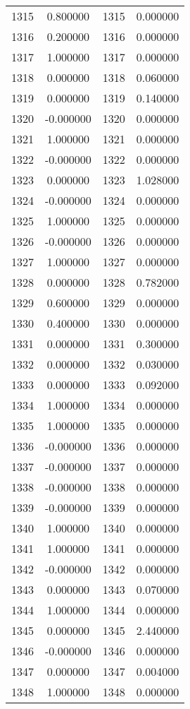 \documentclass[12pt]{article}
\begin{document}
\begin{longtable}{@{}cccc@{}}
1315 & 0.800000 & 1315 & 0.000000 \\
1316 & 0.200000 & 1316 & 0.000000 \\
1317 & 1.000000 & 1317 & 0.000000 \\
1318 & 0.000000 & 1318 & 0.060000 \\
1319 & 0.000000 & 1319 & 0.140000 \\
1320 & -0.000000 & 1320 & 0.000000 \\
1321 & 1.000000 & 1321 & 0.000000 \\
1322 & -0.000000 & 1322 & 0.000000 \\
1323 & 0.000000 & 1323 & 1.028000 \\
1324 & -0.000000 & 1324 & 0.000000 \\
1325 & 1.000000 & 1325 & 0.000000 \\
1326 & -0.000000 & 1326 & 0.000000 \\
1327 & 1.000000 & 1327 & 0.000000 \\
1328 & 0.000000 & 1328 & 0.782000 \\
1329 & 0.600000 & 1329 & 0.000000 \\
1330 & 0.400000 & 1330 & 0.000000 \\
1331 & 0.000000 & 1331 & 0.300000 \\
1332 & 0.000000 & 1332 & 0.030000 \\
1333 & 0.000000 & 1333 & 0.092000 \\
1334 & 1.000000 & 1334 & 0.000000 \\
1335 & 1.000000 & 1335 & 0.000000 \\
1336 & -0.000000 & 1336 & 0.000000 \\
1337 & -0.000000 & 1337 & 0.000000 \\
1338 & -0.000000 & 1338 & 0.000000 \\
1339 & -0.000000 & 1339 & 0.000000 \\
1340 & 1.000000 & 1340 & 0.000000 \\
1341 & 1.000000 & 1341 & 0.000000 \\
1342 & -0.000000 & 1342 & 0.000000 \\
1343 & 0.000000 & 1343 & 0.070000 \\
1344 & 1.000000 & 1344 & 0.000000 \\
1345 & 0.000000 & 1345 & 2.440000 \\
1346 & -0.000000 & 1346 & 0.000000 \\
1347 & 0.000000 & 1347 & 0.004000 \\
1348 & 1.000000 & 1348 & 0.000000 \\

\end{longtable}
\end{document}
